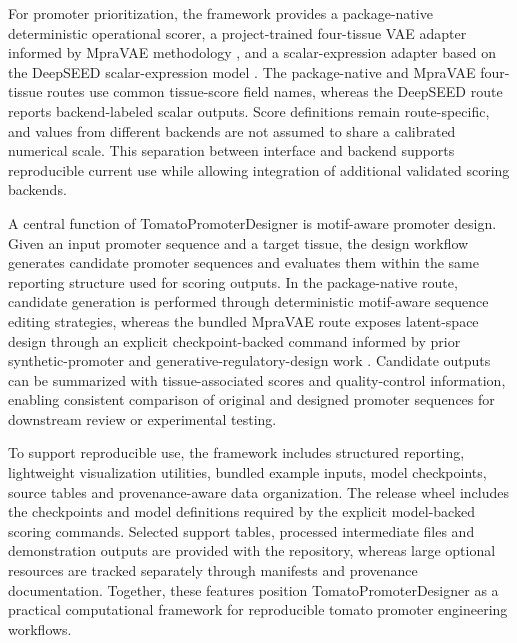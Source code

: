 \documentclass[numsec,webpdf,modern,large]{oup-authoring-template}
\begin{document}
For promoter prioritization, the framework provides a package-native deterministic operational scorer, a project-trained four-tissue VAE adapter informed by MpraVAE methodology \citep{Jin2024}, and a scalar-expression adapter based on the DeepSEED scalar-expression model \citep{Zhang2023}. The package-native and MpraVAE four-tissue routes use common tissue-score field names, whereas the DeepSEED route reports backend-labeled scalar outputs. Score definitions remain route-specific, and values from different backends are not assumed to share a calibrated numerical scale. This separation between interface and backend supports reproducible current use while allowing integration of additional validated scoring backends.

A central function of TomatoPromoterDesigner is motif-aware promoter design. Given an input promoter sequence and a target tissue, the design workflow generates candidate promoter sequences and evaluates them within the same reporting structure used for scoring outputs. In the package-native route, candidate generation is performed through deterministic motif-aware sequence editing strategies, whereas the bundled MpraVAE route exposes latent-space design through an explicit checkpoint-backed command informed by prior synthetic-promoter and generative-regulatory-design work \citep{Kotopka2020,Yang2021,Jin2024}. Candidate outputs can be summarized with tissue-associated scores and quality-control information, enabling consistent comparison of original and designed promoter sequences for downstream review or experimental testing.

To support reproducible use, the framework includes structured reporting, lightweight visualization utilities, bundled example inputs, model checkpoints, source tables and provenance-aware data organization. The release wheel includes the checkpoints and model definitions required by the explicit model-backed scoring commands. Selected support tables, processed intermediate files and demonstration outputs are provided with the repository, whereas large optional resources are tracked separately through manifests and provenance documentation. Together, these features position TomatoPromoterDesigner as a practical computational framework for reproducible tomato promoter engineering workflows.
\end{document}
